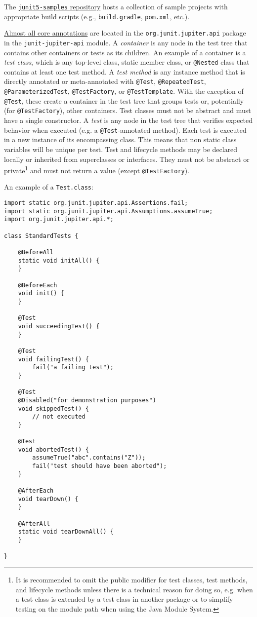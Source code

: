 \documentclass[8pt, table, xcdraw]{article}%
\begin{document}
The \href{https://github.com/junit-team/junit5-samples}{\lstinline{junit5-samples} repository} hosts a collection of sample projects with appropriate build scripts (e.g., \lstinline{build.gradle}, \lstinline{pom.xml}, etc.).

\href{https://junit.org/junit5/docs/current/user-guide/#writing-tests-annotations}{Almost all core annotations} are located in the \lstinline{org.junit.jupiter.api} package in the \lstinline{junit-jupiter-api} module. A \emph{container} is any node in the test tree that contains other containers or tests as its children. An example of a container is a \emph{test class}, which is any top-level class, static member class, or \lstinline{@Nested} class that contains at least one test method. A \emph{test method} is any instance method that is directly annotated or meta-annotated with \lstinline{@Test}, \lstinline{@RepeatedTest}, \lstinline{@ParameterizedTest}, \lstinline{@TestFactory}, or \lstinline{@TestTemplate}. With the exception of \lstinline{@Test}, these create a container in the test tree that groups tests or, potentially (for \lstinline{@TestFactory}), other containers. Test classes must not be abstract and must have a single constructor. A \emph{test} is any node in the test tree that verifies expected behavior when executed (e.g. a \lstinline{@Test}-annotated method). Each test is executed in a new instance of its encompassing class. This means that non static class variables will be unique per test. Test and lifecycle methods may be declared locally or inherited from superclasses or interfaces. They must not be abstract or private\footnote{It is recommended to omit the public modifier for test classes, test methods, and lifecycle methods unless there is a technical reason for doing so, e.g. when a test class is extended by a test class in another package or to simplify testing on the module path when using the Java Module System.} and must not return a value (except \lstinline{@TestFactory}).

An example of a \lstinline{Test.class}:

\begin{lstlisting}
import static org.junit.jupiter.api.Assertions.fail;
import static org.junit.jupiter.api.Assumptions.assumeTrue;
import org.junit.jupiter.api.*;

class StandardTests {

    @BeforeAll
    static void initAll() {
    }

    @BeforeEach
    void init() {
    }

    @Test
    void succeedingTest() {
    }

    @Test
    void failingTest() {
        fail("a failing test");
    }

    @Test
    @Disabled("for demonstration purposes")
    void skippedTest() {
        // not executed
    }

    @Test
    void abortedTest() {
        assumeTrue("abc".contains("Z"));
        fail("test should have been aborted");
    }

    @AfterEach
    void tearDown() {
    }

    @AfterAll
    static void tearDownAll() {
    }

}
\end{lstlisting}
\end{document}
